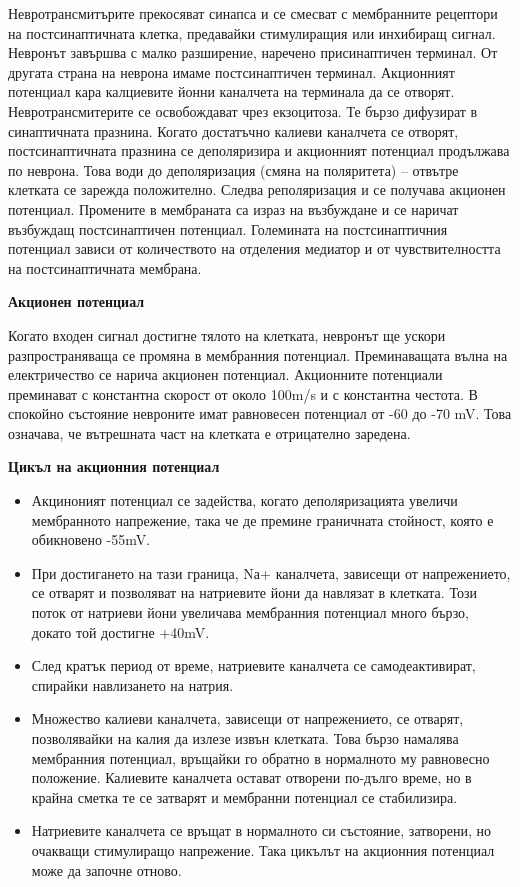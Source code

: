 \documentclass{article}
\numberwithin{equation}{section}
\begin{document}
Невротрансмитърите прекосяват синапса и се смесват с мембранните рецептори на постсинаптичната клетка, предавайки стимулиращия или инхибиращ
сигнал. Невронът завършва с малко разширение, наречено присинаптичен терминал. От другата страна на неврона имаме постсинаптичен терминал.
Акционният потенциал кара калциевите йонни каналчета на терминала да се отворят. Невротрансмитерите се освобождават чрез екзоцитоза. Те
бързо дифузират в синаптичната празнина. Когато достатъчно калиеви каналчета се отворят, постсинаптичната празнина се деполяризира и
акционният потенциал продължава по неврона. Това води до деполяризация (смяна на поляритета) -- отвътре клетката се зарежда положително.
Следва реполяризация и се получава акционен потенциал. Промените в мембраната  са израз на възбуждане и се наричат възбуждащ постсинаптичен
потенциал. Големината на постсинаптичния потенциал зависи от количеството на отделения медиатор и от чувствителността на постсинаптичната
мембрана.

\vspace{5mm} %
\textbf{Акционен потенциал}

Когато входен сигнал достигне тялото на клетката, невронът ще ускори разпространяваща се промяна в мембранния потенциал. Преминаващата вълна
на електричество се нарича акционен потенциал. Акционните потенциали преминават с константна скорост от около 100m/s и с константна честота.
В спокойно състояние невроните имат равновесен потенциал от -60 до -70 mV. Това означава, че вътрешната част на клетката е отрицателно
заредена.

\vspace{5mm} %
\textbf{Цикъл на акционния потенциал}

\begin{itemize}
\item Акциноният потенциал се задейства, когато деполяризацията увеличи мембранното напрежение, така че де премине граничната стойност, която е
обикновено -55mV.
\item При достигането на тази граница, Nа+ каналчета, зависещи от напрежението, се отварят и позволяват на натриевите йони да
навлязат в клетката. Този поток от натриеви йони увеличава мембранния потенциал много бързо, докато той достигне +40mV.
\item След кратък период от време, натриевите каналчета се самодеактивират, спирайки навлизането на натрия.
\item Множество калиеви каналчета, зависещи от напрежението, се отварят, позволявайки на калия да излезе извън клетката. Това бързо намалява
    мембранния потенциал, връщайки го обратно в нормалното му равновесно положение. Калиевите каналчета остават отворени по-дълго време, но
    в крайна сметка те се затварят и мембранни потенциал се стабилизира.
\item Натриевите каналчета се връщат в нормалното си състояние, затворени, но очакващи стимулиращо напрежение.  Така цикълът на акционния
потенциал може да започне отново.
\end{itemize}
\end{document}
